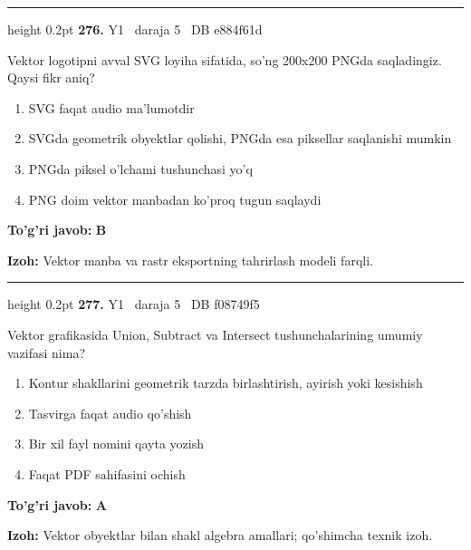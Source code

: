 \documentclass[10pt,a4paper,oneside]{article}
\begin{document}
\vspace{2mm}\hrule height 0.2pt \vspace{4mm}
\hypertarget{q276}{\textbf{\color{ink}276.}}  {\color{muted}\scriptsize Y1 \textbullet\ daraja 5 \textbullet\ DB e884f61d}
\par
Vektor logotipni avval SVG loyiha sifatida, so'ng 200x200 PNGda saqladingiz. Qaysi fikr aniq?
\begin{enumerate}[label=\Alph*),leftmargin=9mm]
\item SVG faqat audio ma'lumotdir
\item SVGda geometrik obyektlar qolishi, PNGda esa piksellar saqlanishi mumkin
\item PNGda piksel o'lchami tushunchasi yo'q
\item PNG doim vektor manbadan ko'proq tugun saqlaydi
\end{enumerate}
\begin{tcolorbox}[enhanced,breakable,colback=teal!4,colframe=teal!45!black,boxrule=0.45pt,arc=1.2mm,left=2.8mm,right=2.8mm,top=2mm,bottom=2mm,before skip=2mm,after skip=2mm]
\textbf{\color{teal}To'g'ri javob:} \textbf{B}
\par\smallskip
\textbf{Izoh:} Vektor manba va rastr eksportning tahrirlash modeli farqli.
\end{tcolorbox}
\vspace{2mm}\hrule height 0.2pt \vspace{4mm}
\hypertarget{q277}{\textbf{\color{ink}277.}}  {\color{muted}\scriptsize Y1 \textbullet\ daraja 5 \textbullet\ DB f08749f5}
\par
Vektor grafikasida Union, Subtract va Intersect tushunchalarining umumiy vazifasi nima?
\begin{enumerate}[label=\Alph*),leftmargin=9mm]
\item Kontur shakllarini geometrik tarzda birlashtirish, ayirish yoki kesishish
\item Tasvirga faqat audio qo'shish
\item Bir xil fayl nomini qayta yozish
\item Faqat PDF sahifasini ochish
\end{enumerate}
\begin{tcolorbox}[enhanced,breakable,colback=teal!4,colframe=teal!45!black,boxrule=0.45pt,arc=1.2mm,left=2.8mm,right=2.8mm,top=2mm,bottom=2mm,before skip=2mm,after skip=2mm]
\textbf{\color{teal}To'g'ri javob:} \textbf{A}
\par\smallskip
\textbf{Izoh:} Vektor obyektlar bilan shakl algebra amallari; qo'shimcha texnik izoh.
\end{tcolorbox}
\end{document}
